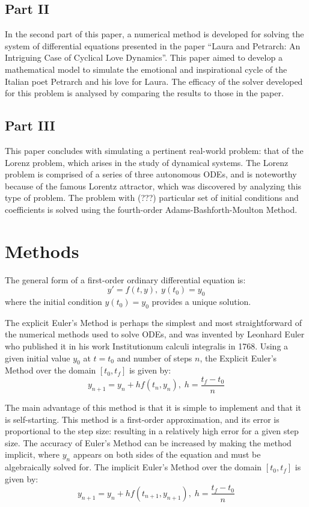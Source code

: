 \documentclass[11pt]{article}
\begin{document}
\subsection{Part II}\label{S:2.2}
%
In the second part of this paper, a numerical method is developed for solving the
system of differential equations presented in the paper “Laura and Petrarch: An 
Intriguing Case of Cyclical Love Dynamics”. This paper aimed to develop a mathematical
model to simulate the emotional and inspirational cycle of the Italian poet Petrarch
and his love for Laura. The efficacy of the solver developed for this problem is
analysed by comparing the results to those in the paper.
\subsection{Part III}\label{S:2.3}
%
This paper concludes with simulating a pertinent real-world problem: that of the 
Lorenz problem, which arises in the study of dynamical systems. The Lorenz problem
is comprised of a series of three autonomous ODEs, and is noteworthy because of
the famous Lorentz attractor, which was discovered by analyzing this type of 
problem. The problem with (???) particular set of initial conditions and coefficients
is solved using the fourth-order Adams-Bashforth-Moulton Method.
\section{Methods}\label{S:3}

The general form of a first-order ordinary differential equation is:
$$y'=f(t,y),\; y(t_0)=y_0$$
where the initial condition $y(t_0)=y_0$ provides a unique solution.

The explicit Euler's Method is perhaps the simplest and most straightforward of
the numerical methods used to solve ODEs, and was invented by Leonhard Euler who 
published it in his work Institutionum calculi integralis in 1768. Using a given
initial value $y_0$ at $t=t_0$ and number of steps $n$, the Explicit Euler's Method over
the domain $[t_0, t_f]$ is given by:
$$y_{n+1} = y_{n}+hf(t_{n}, y_{n}),\; h=\frac{t_f-t_0}{n}$$

The main advantage of this method is that it is simple to implement and that it
is self-starting. This method is a first-order approximation, and its error is
proportional to the step size: resulting in a relatively high error for a given
step size. The accuracy of Euler's Method can be increased by making the method 
implicit, where $y_n$ appears on both sides of the equation and must be algebraically
solved for. The implicit Euler's Method over the domain $[t_0, t_f]$ is given by:
$$y_{n+1} = y_{n}+hf(t_{n+1}, y_{n+1}),\; h=\frac{t_f-t_0}{n}$$
\end{document}
